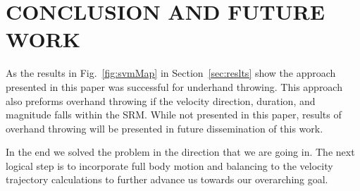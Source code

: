 \section{CONCLUSION AND FUTURE WORK}\label{sec:conc}

As the results in Fig.~\ref{fig:svmMap} in Section~\ref{sec:reslts} show the approach presented in this paper was successful for underhand throwing.  This approach also preforms overhand throwing if the velocity direction, duration, and magnitude falls within the SRM.  While not presented in this paper, results of overhand throwing will be presented in future dissemination of this work.

In the end we solved the problem in the direction that we are going in.  The next logical step is to incorporate full body motion and balancing to the velocity trajectory calculations to further advance us towards our overarching goal.


